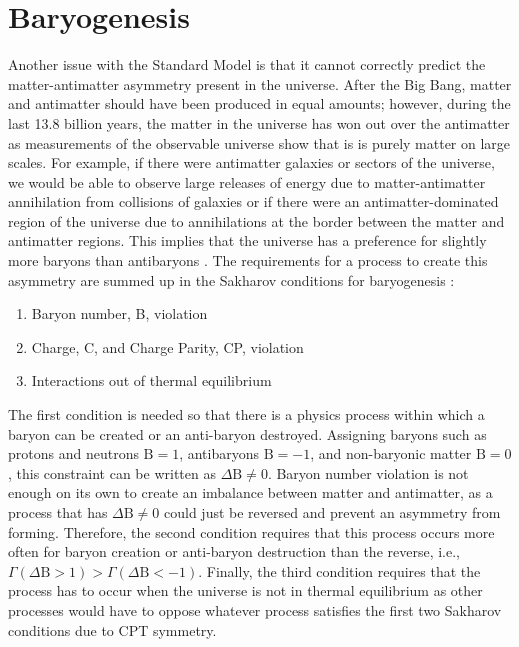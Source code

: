 \section{Baryogenesis}

Another issue with the Standard Model is that it cannot correctly predict the matter-antimatter asymmetry present in the universe. After the Big Bang, matter and antimatter should have been produced in equal amounts; however, during the last 13.8 billion years, the matter in the universe has won out over the antimatter as measurements of the observable universe show that is is purely matter on large scales. For example, if there were antimatter galaxies or sectors of the universe, we would be able to observe large releases of energy due to matter-antimatter annihilation from collisions of galaxies or if there were an antimatter-dominated region of the universe due to annihilations at the border between the matter and antimatter regions. This implies that the universe has a preference for slightly more baryons than antibaryons \cite{Canetti:2012zc}. The requirements for a process to create this asymmetry are summed up in the Sakharov conditions for baryogenesis \cite{Sakharov:1967dj}:
\begin{enumerate}
\item Baryon number, B, violation
\item Charge, C, and Charge Parity, CP, violation
\item Interactions out of thermal equilibrium
\end{enumerate}
The first condition is needed so that there is a physics process within which a baryon can be created or an anti-baryon destroyed. Assigning baryons such as protons and neutrons $\textrm{B}=1$, antibaryons $\textrm{B}=-1$, and non-baryonic matter $\textrm{B}=0$, this constraint can be written as $\Delta \textrm{B}\neq0$. Baryon number violation is not enough on its own to create an imbalance between matter and antimatter, as a process that has $\Delta\textrm{B}\neq0$ could just be reversed and prevent an asymmetry from forming. Therefore, the second condition requires that this process occurs more often for baryon creation or anti-baryon destruction than the reverse, i.e., $\Gamma(\Delta \textrm{B}>1) > \Gamma(\Delta \textrm{B}<-1)$. Finally, the third condition requires that the process has to occur when the universe is not in thermal equilibrium as other processes would have to oppose whatever process satisfies the first two Sakharov conditions due to CPT symmetry.

